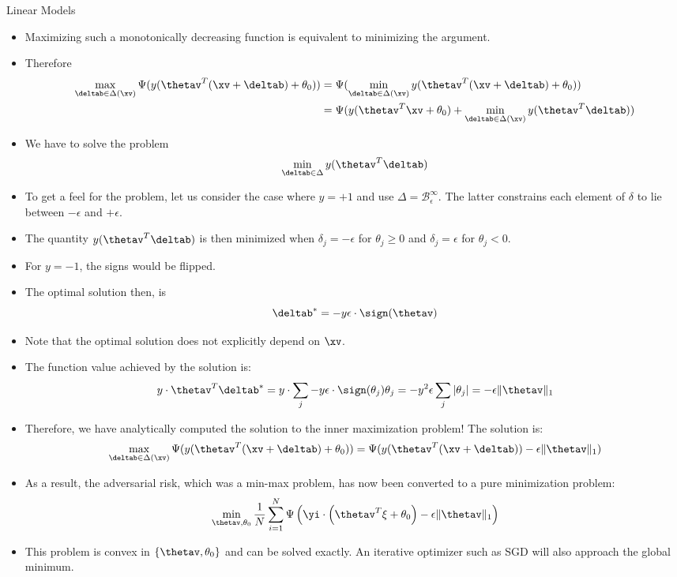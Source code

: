 \documentclass[11pt,compress,t,notes=noshow, xcolor=table]{beamer}
\begin{document}
\begin{vbframe} {Linear Models}
  \begin{itemize}
    \item Maximizing such a monotonically decreasing function is equivalent to minimizing the argument.
    \lz
    \item Therefore
          \begin{align*}
            \max_{\deltab \in \Delta(\xv)} \Psi(y (\thetav^T(\xv + \deltab) + \theta_0)) &= \Psi(\min_{\deltab \in \Delta(\xv)}y (\thetav^T(\xv + \deltab) + \theta_0)) \\
                                                                                    &= \Psi (y (\thetav^T\xv + \theta_0) + \min_{\deltab \in \Delta(\xv)} y (\thetav^T \deltab))
          \end{align*}
    \lz
    \item We have to solve the problem
    $$ \min_{\deltab \in \Delta} y (\thetav^T \deltab) $$
  \end{itemize}

\framebreak

  \begin{itemize}
    \item To get a feel for the problem, let us consider the case where $y = +1$ and use $\Delta = \mathcal{B}^{\infty}_{\epsilon}$. The latter constrains each element of $\delta$ to lie between $-\epsilon$ and $+\epsilon$.
    \lz
    \item The quantity $y (\thetav^T \deltab)$ is then minimized when $\delta_j = - \epsilon$ for $\theta_{j} \geq 0$ and $\delta_j = \epsilon$ for $\theta_{j}<0$.
    \lz
    \item For $y = -1$, the signs would be flipped.
    \lz
    \item The optimal solution then, is
    $$\deltab^* = -y\epsilon \cdot \sign(\thetav) $$
    \item Note that the optimal solution does not explicitly depend on $\xv$. 

\framebreak

  \item The function value achieved by the solution is: 
  $$y \cdot \thetav^T \deltab^* = y \cdot \sum_j -y \epsilon \cdot \sign(\theta_j)\theta_j = - y^2 \epsilon \sum_j | \theta_j | = -\epsilon\|\thetav\|_{1} $$
  \item Therefore, we have analytically computed the solution to the inner maximization problem! The solution is:
  $$ \max_{\deltab \in \Delta(\xv)} \Psi(y (\thetav^T(\xv + \deltab) + \theta_0)) =  \Psi (y (\thetav^T(\xv + \deltab)) -\epsilon\|\thetav\|_{1}) $$
  \item As a result, the adversarial risk, which was a min-max problem, has now been converted to a pure minimization problem:
  $$\min_{\thetav, \theta_0} \frac{1}{N} \sum_{i = 1}^{N} \Psi \left(\yi \cdot\left(\thetav^{T} \xi +\theta_0\right)-\epsilon\|\thetav\|_{1}\right)$$
  \item This problem is convex in $\{\thetav, \theta_0\}$ and can be solved exactly. An iterative optimizer such as SGD will also approach the global minimum.
  \end{itemize}
  
\end{vbframe}
\end{document}
